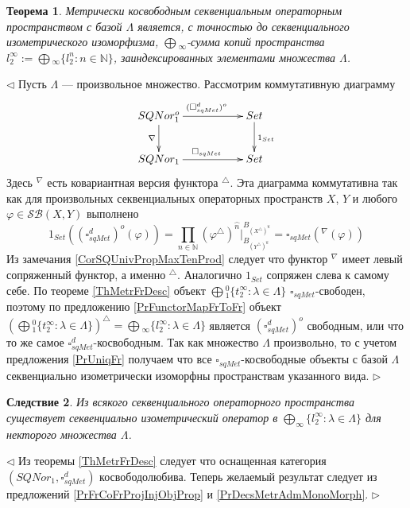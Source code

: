 \documentclass[12pt]{article}
\newtheorem{theorem}{Теорема}[subsection]
\newtheorem{corollary}[theorem]{Следствие}
\newenvironment{proof}{\par $\triangleleft$}{$\triangleright$}
\begin{document}
\begin{theorem}\label{ThMetCoFrDesc}
Метрически косвободным секвенциальным операторным пространством с базой $\Lambda$ является, с точностью до секвенциального изометрического изоморфизма, 
$\bigoplus{}_\infty$-сумма копий пространства $l_2^\infty:=\bigoplus{}_\infty\{l_2^n:n\in\mathbb{N}\}$, заиндексированных элементами множества $\Lambda$.
\end{theorem}
\begin{proof}
Пусть $\Lambda$ --- произвольное множество. Рассмотрим коммутативную диаграмму
$$
\xymatrix{
SQNor_1^o \ar[d]_{\nabla } \ar[rr]^{(\square_{sqMet}^{d})^o} & & {Set}\ar[d]^{1_{Set}}\\
SQNor_1\ar[rr]^{\square_{sqMet}}&  &{Set}}
$$
Здесь ${}^\nabla$ есть ковариантная версия функтора ${}^\triangle$.
Эта диаграмма коммутативна так как для произвольных секвенциальных операторных пространств $X$, $Y$ и любого $\varphi\in\mathcal{SB}(X,Y)$ выполнено
$$
1_{Set}((\square_{sqMet}^d)^o(\varphi))
=\prod\limits_{n\in\mathbb{N}} (\varphi^\triangle )^{\wideparen{n}}|_{B_{(Y^\triangle )^{\wideparen{n}}}}^{B_{(X^\triangle )^{\wideparen{n}}}}
=\square_{sqMet}({}^\nabla(\varphi))
$$
Из замечания \ref{CorSQUnivPropMaxTenProd} следует что функтор ${}^\nabla$ имеет левый сопряженный функтор, а именно ${}^\triangle$. Аналогично $1_{Set}$ сопряжен слева к самому себе. 
По теореме \ref{ThMetrFrDesc} объект $\bigoplus{}_1^0\{t_2^\infty:\lambda\in\Lambda\}$ $\square_{sqMet}$-свободен, поэтому по предложению \ref{PrFunctorMapFrToFr} объект 
$(\bigoplus{}_1^0\{t_2^\infty:\lambda\in\Lambda\})^\triangle=\bigoplus{}_\infty\{l_2^\infty:\lambda\in\Lambda\}$ является $(\square_{sqMet}^d)^o$ свободным, или что то же самое $\square_{sqMet}^d$-косвободным. 
Так как множество $\Lambda$ произвольно, то с учетом предложения \ref{PrUniqFr} получаем что все $\square_{sqMet}$-косвободные объекты с базой 
$\Lambda$ секвенциально изометрически изоморфны пространствам указанного вида.
\end{proof}

\begin{corollary}\label{CorSQSpaceIsFromMetrAdmMonoMorph}
Из всякого секвенциального операторного пространства существует секвенциально изометрический оператор в $\bigoplus_\infty\{l_2^\infty:\lambda\in\Lambda\}$ для некторого множества $\Lambda$.
\end{corollary}
\begin{proof}
Из теоремы \ref{ThMetrFrDesc} следует что оснащенная категория $(SQNor_1,\square_{sqMet}^d)$ косвободолюбива. Теперь желаемый результат следует из предложений \ref{PrFrCoFrProjInjObjProp} и \ref{PrDecsMetrAdmMonoMorph}.
\end{proof}
\end{document}
